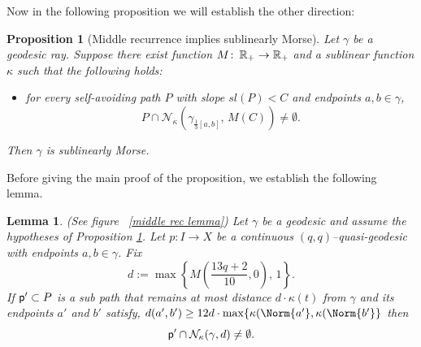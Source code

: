 \documentclass[12 pt]{amsart}
\newcommand{\calN}{\mathcal{N}}
\newcommand{\RR}{\mathbb{R}}
\newcommand{\gothic}{\mathfrak}
\newcommand{\go}{{\gothic o}}
\newtheorem{proposition}[theorem]{Proposition}
\newtheorem{lemma}[theorem]{Lemma}
\theoremstyle{definition}
\theoremstyle{remark}
\newcommand{\pp}{{\sf p}}
\newcommand{\from}{\colon\thinspace}
\begin{document}


Now in the following proposition we will establish the other direction:
\begin{proposition}[Middle recurrence implies sublinearly Morse] \label{prop3.4}
 Let $\gamma$ be a geodesic ray. Suppose  there exist function $M \from \mathbb{R_{+}}\to\mathbb{R_{+}}$ and a sublinear function $\kappa$ such that the following holds:  
 \begin{itemize}
     \item for every self-avoiding path $P$ with slope $sl(P)<C$ and endpoints $a,b\in\gamma$,
\[
P \cap \mathcal{N}_\kappa \left(\gamma_{\frac13 [a,b]},\, M(C)\right)\neq \emptyset.
\]
 \end{itemize}
 Then $\gamma$ is sublinearly Morse. 


\end{proposition}
Before giving the main proof of the proposition, we establish the following lemma. 
\begin{lemma}\label{middle rec quasi geodesic} (See figure ~\ref{middle rec lemma})
Let $\gamma$ be a geodesic and assume the hypotheses of Proposition \ref{prop3.4}. Let $p:I\to X$ be a continuous $(q,q)$--quasi-geodesic with endpoints $a,b\in\gamma$.
Fix
\[
d:=\max\left\{M\left(\frac{13q+2}{10},0\right),\,1\right\}.
\]
If $\pp'\subset P$ is a sub path that remains at most distance $d\cdot\kappa(t)$ from $\gamma$ and its endpoints
$a'$ and $b'$ satisfy,
$
d(a',b') \geq 12d \cdot \max \{ \kappa(\Norm{a'},  \kappa(\Norm{b'} \}
$
then
\[
\pp'\cap \mathcal N_{\kappa}(\gamma,d)\neq\emptyset.
\]
\end{lemma} 
\end{document}
